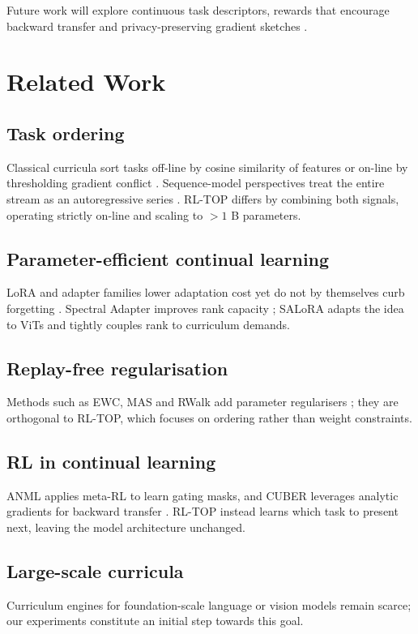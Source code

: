 \documentclass{article}
\begin{document}
Future work will explore continuous task descriptors, rewards that encourage backward transfer \cite{lin-2022-beyond} and privacy-preserving gradient sketches \cite{geiping-2020-inverting,zhu-2020-gap}.

\section{Related Work}
\subsection{Task ordering}
Classical curricula sort tasks off-line by cosine similarity of features \cite{ke-2021-continual} or on-line by thresholding gradient conflict \cite{bengio-2020-interference}. Sequence-model perspectives treat the entire stream as an autoregressive series \cite{lee-2023-recasting}. RL-TOP differs by combining both signals, operating strictly on-line and scaling to $> 1$ B parameters.

\subsection{Parameter-efficient continual learning}
LoRA and adapter families lower adaptation cost yet do not by themselves curb forgetting \cite{mercea-2024-time,sehanobish-2024-structured}. Spectral Adapter improves rank capacity \cite{zhang-2024-spectral}; SALoRA adapts the idea to ViTs and tightly couples rank to curriculum demands.

\subsection{Replay-free regularisation}
Methods such as EWC, MAS and RWalk add parameter regularisers \cite{veniat-2020-efficient}; they are orthogonal to RL-TOP, which focuses on ordering rather than weight constraints.

\subsection{RL in continual learning}
ANML applies meta-RL to learn gating masks, and CUBER leverages analytic gradients for backward transfer \cite{lin-2022-beyond}. RL-TOP instead learns which task to present next, leaving the model architecture unchanged.

\subsection{Large-scale curricula}
Curriculum engines for foundation-scale language or vision models remain scarce; our experiments constitute an initial step towards this goal.
\end{document}
